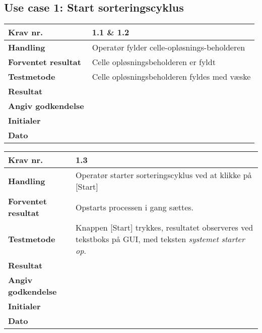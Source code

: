\subsection{Use case 1: Start sorteringscyklus}

	\begin{center}
		\begin{longtable}{ | m{4cm}| m{8.5cm}|} 
			\hline
			\textbf{Krav nr.} & 1.1 \& 1.2    \\ 
			\hline
			\textbf{Handling} &  Operatør fylder celle-opløsnings-beholderen   \\
			\hline
			\textbf{Forventet resultat} &  Celle opløsningsbeholderen er fyldt  \\
			\hline
			\textbf{Testmetode}  &  Celle opløsningsbeholderen fyldes med væske  \\
			\hline
			\textbf{Resultat}  &    \\
			\hline
			\textbf{Angiv godkendelse} &     \\
			\hline
			\textbf{Initialer} &     \\
			\hline
			\textbf{Dato} &    \\
			\hline
		\end{longtable}
	\end{center}
	
	
	\begin{center}
		\begin{longtable}{ | m{4cm}| m{8.5cm}|} 
			\hline
			\textbf{Krav nr.} & 1.3    \\ 
			\hline
			\textbf{Handling} &  Operatør starter sorteringscyklus ved at klikke på [Start]  \\
			\hline
			\textbf{Forventet resultat} &  Opstarts processen i gang sættes.  \\
			\hline
			\textbf{Testmetode}  & Knappen [Start] trykkes, resultatet observeres ved tekstboks på GUI, med teksten \textit{systemet starter op}.   \\
			\hline
			\textbf{Resultat}  &    \\
			\hline
			\textbf{Angiv godkendelse} &     \\
			\hline
			\textbf{Initialer} &     \\
			\hline
			\textbf{Dato} &    \\
			\hline
		\end{longtable}
	\end{center}
	
	\newpage
	
